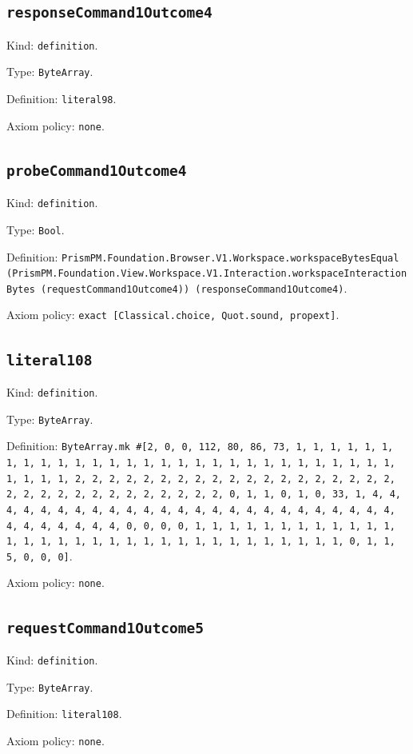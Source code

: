 \documentclass[11pt]{article}
\begin{document}
\subsection*{\texttt{responseCommand1Outcome4}}
\noindent Kind: \texttt{definition}.\par
\noindent Type: \texttt{ByteArray}.\par
\noindent Definition: \texttt{literal98}.\par
\noindent Axiom policy: \texttt{none}.\par
\subsection*{\texttt{probeCommand1Outcome4}}
\noindent Kind: \texttt{definition}.\par
\noindent Type: \texttt{Bool}.\par
\noindent Definition: \texttt{PrismPM.Foundation.Browser.V1.Workspace.workspaceBytesEqual (PrismPM.Foundation.View.Workspace.V1.Interaction.workspaceInteractionBytes (requestCommand1Outcome4)) (responseCommand1Outcome4)}.\par
\noindent Axiom policy: \texttt{exact [Classical.choice, Quot.sound, propext]}.\par
\subsection*{\texttt{literal108}}
\noindent Kind: \texttt{definition}.\par
\noindent Type: \texttt{ByteArray}.\par
\noindent Definition: \texttt{ByteArray.mk \#[2, 0, 0, 112, 80, 86, 73, 1, 1, 1, 1, 1, 1, 1, 1, 1, 1, 1, 1, 1, 1, 1, 1, 1, 1, 1, 1, 1, 1, 1, 1, 1, 1, 1, 1, 1, 1, 1, 1, 1, 2, 2, 2, 2, 2, 2, 2, 2, 2, 2, 2, 2, 2, 2, 2, 2, 2, 2, 2, 2, 2, 2, 2, 2, 2, 2, 2, 2, 2, 2, 2, 2, 0, 1, 1, 0, 1, 0, 33, 1, 4, 4, 4, 4, 4, 4, 4, 4, 4, 4, 4, 4, 4, 4, 4, 4, 4, 4, 4, 4, 4, 4, 4, 4, 4, 4, 4, 4, 4, 4, 4, 4, 0, 0, 0, 0, 1, 1, 1, 1, 1, 1, 1, 1, 1, 1, 1, 1, 1, 1, 1, 1, 1, 1, 1, 1, 1, 1, 1, 1, 1, 1, 1, 1, 1, 1, 1, 1, 0, 1, 1, 5, 0, 0, 0]}.\par
\noindent Axiom policy: \texttt{none}.\par
\subsection*{\texttt{requestCommand1Outcome5}}
\noindent Kind: \texttt{definition}.\par
\noindent Type: \texttt{ByteArray}.\par
\noindent Definition: \texttt{literal108}.\par
\noindent Axiom policy: \texttt{none}.\par
\end{document}
